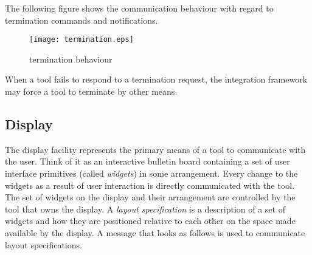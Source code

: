 \documentclass{article}
\begin{document}
   The following figure shows the communication behaviour with regard to
   termination commands and notifications.

   \begin{figure}[H]
    \begin{center}
     \texttt{[image: termination.eps]}
    \end{center}
    \vspace{-0.5cm}
    \caption{termination behaviour}
   \end{figure} 
   
   \noindent When a tool fails to respond to a termination request, the
   integration framework may force a tool to terminate by other means.

  \subsection{Display} \label{ss:user_interaction}

   The display facility represents the primary means of a tool to communicate
   with the user.  Think of it as an interactive bulletin board containing a
   set of user interface primitives (called \textit{widgets}) in some
   arrangement.  Every change to the widgets as a result of user interaction is
   directly communicated with the tool.  The set of widgets on the display and
   their arrangement are controlled by the tool that owns the display.  A
   \textit{layout specification} is a description of a set of widgets and how
   they are positioned relative to each other on the space made available by
   the display. A message that looks as follows is used to communicate layout
   specifications.
   
\end{document}
